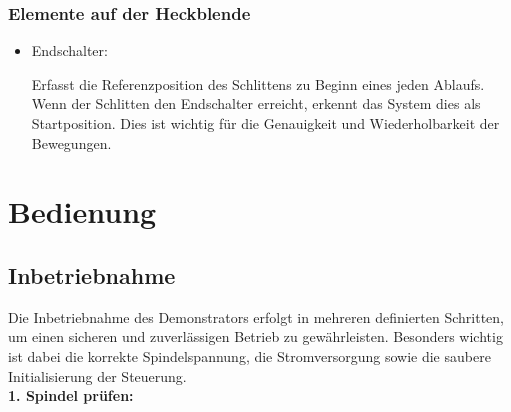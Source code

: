 \documentclass[a4paper,12pt]{report}
\begin{document}
	\subsection{Elemente auf der Heckblende}
	\begin{itemize}[leftmargin=1.5em]
		
		\item Endschalter:
		
		Erfasst die Referenzposition des Schlittens zu Beginn eines jeden Ablaufs. Wenn der Schlitten den Endschalter erreicht, erkennt das System dies als Startposition. Dies ist wichtig für die Genauigkeit und Wiederholbarkeit der Bewegungen.\\
		
	\end{itemize}
	
	
	\chapter{Bedienung}
	\section{Inbetriebnahme}

		Die Inbetriebnahme des Demonstrators erfolgt in mehreren definierten Schritten, um einen sicheren und zuverlässigen Betrieb zu gewährleisten. Besonders wichtig ist dabei die korrekte Spindelspannung, die Stromversorgung sowie die saubere Initialisierung der Steuerung. \\[0,75cm]
		
		\noindent\textbf{1. Spindel prüfen:}
		
\end{document}
